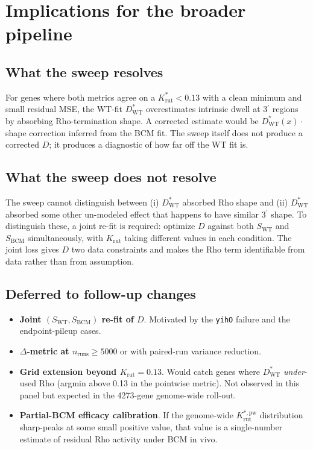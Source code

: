 \documentclass[11pt]{article}
\newcommand{\Krut}{K_{\text{rut}}}
\newcommand{\Dstar}{D^{\!*}}
\newcommand{\DstarWT}{\Dstar_{\text{WT}}}
\newcommand{\SWT}{S_{\text{WT}}}
\newcommand{\SBCM}{S_{\text{BCM}}}
\begin{document}
\section{Implications for the broader pipeline}

\subsection{What the sweep resolves}

For genes where both metrics agree on a $K^{*}_{\text{rut}} < 0.13$ with a clean
minimum and small residual MSE, the WT-fit $\DstarWT$ overestimates
intrinsic dwell at 3$^\prime$ regions by absorbing Rho-termination
shape. A corrected estimate would be $\DstarWT(x) \cdot$ shape
correction inferred from the BCM fit. The sweep itself does not
produce a corrected $D$; it produces a diagnostic of how far off the
WT fit is.

\subsection{What the sweep does not resolve}

The sweep cannot distinguish between (i) $\DstarWT$ absorbed Rho
shape and (ii) $\DstarWT$ absorbed some other un-modeled effect that
happens to have similar 3$^\prime$ shape. To distinguish these, a
joint re-fit is required: optimize $D$ against both $\SWT$ and
$\SBCM$ simultaneously, with $\Krut$ taking different values in each
condition. The joint loss gives $D$ two data constraints and makes
the Rho term identifiable from data rather than from assumption.

\subsection{Deferred to follow-up changes}

\begin{itemize}
\item \textbf{Joint $(\SWT, \SBCM)$ re-fit of $D$}. Motivated by the
  \texttt{yihO} failure and the endpoint-pileup cases.
\item \textbf{$\Delta$-metric at $n_{\text{runs}} \ge 5000$} or with
  paired-run variance reduction.
\item \textbf{Grid extension beyond $\Krut=0.13$}. Would catch genes
  where $\DstarWT$ \emph{under}-used Rho (argmin above 0.13 in the
  pointwise metric). Not observed in this panel but expected in the
  4273-gene genome-wide roll-out.
\item \textbf{Partial-BCM efficacy calibration}. If the genome-wide
  $K^{*,\text{pw}}_{\text{rut}}$ distribution sharp-peaks at some small
  positive value, that value is a single-number estimate of residual
  Rho activity under BCM in vivo.
\end{itemize}
\end{document}
